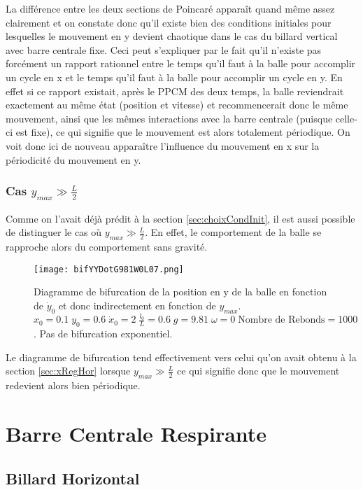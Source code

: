 \documentclass[a4paper]{report}
\begin{document}
La différence entre les deux sections de Poincaré apparaît quand même assez clairement et on constate donc qu'il existe bien des conditions initiales pour lesquelles le mouvement en y devient chaotique dans le cas du billard vertical avec barre centrale fixe. Ceci peut s'expliquer par le fait qu'il n'existe pas forcément un rapport rationnel entre le temps qu'il faut à la balle pour accomplir un cycle en x et le temps qu'il faut à la balle pour accomplir un cycle en y. En effet si ce rapport existait, après le PPCM des deux temps, la balle reviendrait exactement au même état (position et vitesse) et recommencerait donc le même mouvement, ainsi que les mêmes interactions avec la barre centrale (puisque celle-ci est fixe), ce qui signifie que le mouvement est alors totalement périodique. On voit donc ici de nouveau apparaître l'influence du mouvement en x sur la périodicité du mouvement en y.

\subsection{Cas $ y_{max} \gg \frac{L}{2} $}

Comme on l'avait déjà prédit à la section \ref{sec:choixCondInit}, il est aussi possible de distinguer le cas où \(y_{max} \gg \frac{L}{2} \). En effet, le comportement de la balle se rapproche alors du comportement sans gravité.
\begin{figure}[h!]
   \texttt{[image: bifYYDotG981W0L07.png]}
      \caption[Diagramme de Bifurcation en y en fonction de \(y_{max}\): g=9.81 ]{Diagramme de bifurcation de la position en y de la balle en fonction de \( \dot{y}_0\) et donc indirectement en fonction de \( y_{max} \). \(x_0=0.1 \; y_0=0.6 \; \dot{x}_0=2 \; \frac{l_0}{L}=0.6 \; g=9.81 \; \omega=0 \; \text{Nombre de Rebonds}=1000\). Pas de bifurcation exponentiel.}
\end{figure}
Le diagramme de bifurcation tend effectivement vers celui qu'on avait obtenu à la section \ref{sec:xRegHor} lorsque \(y_{max}\gg\frac{L}{2}\) ce qui signifie donc que le mouvement redevient alors bien périodique.


\chapter{Barre Centrale Respirante}

\section{Billard Horizontal}
\end{document}
